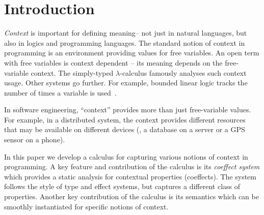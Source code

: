 \newcommand{\SH}{ {\textcolor{sclr}{\mathcal{S}}} }
\newcommand{\sempty}{ {\textcolor{sclr}{ \hat{0}}} }
\renewcommand{\sunit}{ {\textcolor{sclr}{\hat{1}}} }
\newcommand{\stimes}{ {\textcolor{sclr}{\diamond}} }

\newcommand{\sflat}{\star}


\newcommand{\amerge}{ \textcolor{aclr}{ \mathbin{\rotatebox[origin=c]{-90}{$\ltimes$}} } }
\newcommand{\asplit}{ \textcolor{aclr}{ \mathbin{\rotatebox[origin=c]{90}{$\ltimes$}} } }
\newcommand{\aseq}{ \textcolor{aclr}{\circledast}} %
\newcommand{\azero}{ \textcolor{aclr}{\bot} }
\newcommand{\aunit}{ \alift{\cunit} } %
\newcommand{\aweak}{ \alift{\czero} } %

\newcommand{\fcons}{ \times } 
\newcommand{\fempty}{\epsilon}



\section{Introduction}

\emph{Context} is important for defining meaning-- not just in natural languages, but also in logics and 
programming languages.
The standard notion of context in programming is an environment 
providing values for free variables. An open term with free variables is context dependent -- its 
meaning depends on the free-variable context. The simply-typed $\lambda$-calculus famously 
analyses such context usage. 
Other systems go further. %
For example, bounded linear logic tracks the number of times a 
variable is used~\cite{girard1992bounded}.

In software engineering, ``context'' provides more than just free-variable values. For example, in a
distributed system, the context provides different resources that may be available on different 
devices (\eg{}, a database on a server or a GPS sensor on a phone).

In this paper we develop a calculus for capturing various notions of 
context in programming. A key feature and contribution
of the calculus is its \emph{coeffect system} which provides a static analysis for contextual properties (coeffects). The system
follows the style of type and effect systems, but captures a different class of properties. %
Another key contribution of the calculus is its semantics which can be smoothly instantiated for specific notions of context.

